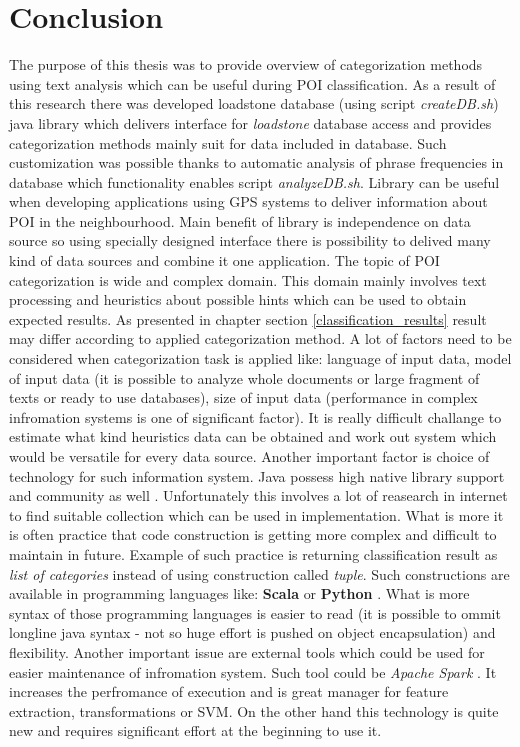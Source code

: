 \section{Conclusion}
The purpose of this thesis was to provide overview of categorization methods using text analysis which can be useful during POI classification. As a result of this research there was developed loadstone database (using script \textit{createDB.sh}) java library which delivers interface for \textit{loadstone} database access and provides categorization methods mainly suit for data included in database. Such customization was possible thanks to automatic analysis of phrase frequencies in database which functionality enables script \textit{analyzeDB.sh}. Library can be useful when developing applications using GPS systems to deliver information about POI in the neighbourhood. Main benefit of library is independence on data source so using specially designed interface there is possibility to delived many kind of data sources and combine it one application. The topic of POI categorization is wide and complex domain. This domain mainly involves text processing and heuristics about possible hints which can be used to obtain expected results. As presented in chapter section \ref{classification_results} result may differ according to applied categorization method. A lot of factors need to be considered when categorization task is applied like: language of input data, model of input data (it is possible to analyze whole documents or large fragment of texts or ready to use databases), size of input data (performance in complex infromation systems is one of significant factor). It is really difficult challange to estimate what kind heuristics data can be obtained and work out system which would be versatile for every data source. Another important factor is choice of technology for such information system. Java possess high native library support and community as well \cite{24} \cite{25}. Unfortunately this involves a lot of reasearch in internet to find suitable collection which can be used in implementation. What is more it is often practice that code construction is getting more complex and difficult to maintain in future. Example of such practice is returning classification result as \textit{list of categories} instead of using construction called \textit{tuple}. Such constructions are available in programming languages like: \textbf{Scala} \cite{26} or \textbf{Python} \cite{27}. What is more syntax of those programming languages is easier to read (it is possible to ommit longline java syntax - not so huge effort is pushed on object encapsulation) and flexibility. Another important issue are external tools which could be used for easier maintenance of infromation system. Such tool could be \textit{Apache Spark} \cite{28}. It increases the perfromance of execution and is great manager for feature extraction, transformations or SVM. On the other hand this technology is quite new and requires significant effort at the beginning to use it.     